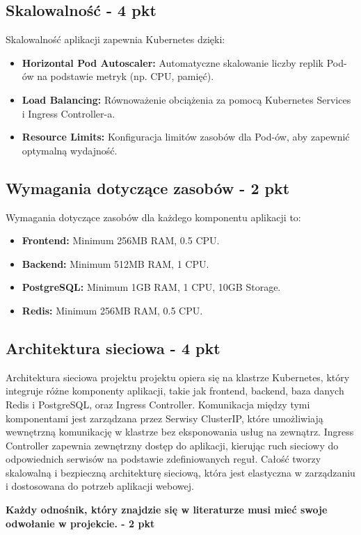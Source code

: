 \documentclass[12pt,a4paper]{article}
\begin{document}
\subsection{Skalowalność - 4 pkt}
\label{sec:ExamplesSection}
Skalowalność aplikacji zapewnia Kubernetes dzięki:
\begin{itemize}
    \item \textbf{Horizontal Pod Autoscaler:} Automatyczne skalowanie liczby replik Pod-ów na podstawie metryk (np. CPU, pamięć).
    \item \textbf{Load Balancing:} Równoważenie obciążenia za pomocą Kubernetes Services i Ingress Controller-a.
    \item \textbf{Resource Limits:} Konfiguracja limitów zasobów dla Pod-ów, aby zapewnić optymalną wydajność.
\end{itemize}

\subsection{Wymagania dotyczące zasobów - 2 pkt}
\label{sec:ExampleTables}
Wymagania dotyczące zasobów dla każdego komponentu aplikacji to:
\begin{itemize}
    \item \textbf{Frontend:} Minimum 256MB RAM, 0.5 CPU.
    \item \textbf{Backend:} Minimum 512MB RAM, 1 CPU.
    \item \textbf{PostgreSQL:} Minimum 1GB RAM, 1 CPU, 10GB Storage.
    \item \textbf{Redis:} Minimum 256MB RAM, 0.5 CPU.
\end{itemize}

\subsection{Architektura sieciowa - 4 pkt}
\label{sec:ExampleResults}
Architektura sieciowa projektu projektu opiera się na klastrze Kubernetes, który integruje różne komponenty aplikacji, takie jak frontend, backend, baza danych Redis i PostgreSQL, oraz Ingress Controller. Komunikacja między tymi komponentami jest zarządzana przez Serwisy ClusterIP, które umożliwiają wewnętrzną komunikację w klastrze bez eksponowania usług na zewnątrz. Ingress Controller zapewnia zewnętrzny dostęp do aplikacji, kierując ruch sieciowy do odpowiednich serwisów na podstawie zdefiniowanych reguł. Całość tworzy skalowalną i bezpieczną architekturę sieciową, która jest elastyczna w zarządzaniu i dostosowana do potrzeb aplikacji webowej.

\noindent
\textbf{Każdy odnośnik, który znajdzie się w literaturze musi mieć swoje odwołanie w projekcie. - 2 pkt} 



\nocite{*}
\end{document}
